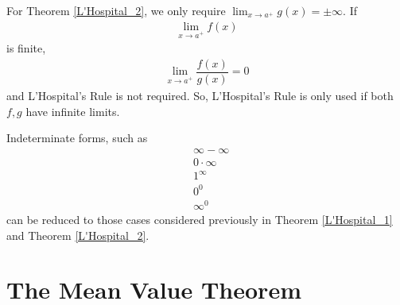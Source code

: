 \begin{note}
For Theorem \ref{L'Hospital_2}, we only require $\lim_{x \longrightarrow a^{+}} g(x) = \pm \infty$. If 
\begin{align*}
    \lim_{x \longrightarrow a^{+}} f(x)
\end{align*} 
is finite,
\begin{align*}
    \lim_{x \longrightarrow a^{+}} \dfrac{f(x)}{g(x)} = 0
\end{align*}
and L'Hospital's Rule is not required. So, L'Hospital's Rule is only used if both $f, g$ have infinite limits.
\end{note}

\begin{note}
Indeterminate forms, such as
\begin{align*}
    &\infty - \infty\\
    &0 \cdot \infty\\
    &1^{\infty}\\
    &0^{0}\\
    &\infty^{0}
\end{align*}
can be reduced to those cases considered previously in Theorem \ref{L'Hospital_1} and Theorem \ref{L'Hospital_2}.
\end{note}

\newpage
\section{The Mean Value Theorem}